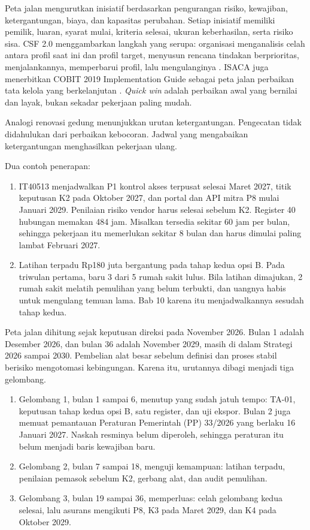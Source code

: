 Peta jalan mengurutkan inisiatif berdasarkan pengurangan risiko, kewajiban, ketergantungan, biaya,
dan kapasitas perubahan. Setiap inisiatif memiliki pemilik, luaran, syarat mulai, kriteria
selesai, ukuran keberhasilan, serta risiko sisa. CSF 2.0 menggambarkan langkah yang serupa:
organisasi menganalisis celah antara profil saat ini dan profil target, menyusun rencana tindakan
berprioritas, menjalankannya, memperbarui profil, lalu mengulanginya \cite{nistcsf2}. ISACA juga
menerbitkan COBIT 2019 Implementation Guide sebagai peta jalan perbaikan tata kelola yang
berkelanjutan \cite{c08-isaca-press}. \textit{Quick win} adalah perbaikan awal yang bernilai dan
layak, bukan sekadar pekerjaan paling mudah.

Analogi renovasi gedung menunjukkan urutan ketergantungan. Pengecatan tidak didahulukan dari
perbaikan kebocoran. Jadwal yang mengabaikan ketergantungan menghasilkan pekerjaan ulang.

Dua contoh penerapan:
\begin{enumerate}
  \item IT40513 menjadwalkan P1 kontrol akses terpusat selesai Maret 2027, titik keputusan K2 pada
  Oktober 2027, dan portal dan API mitra P8 mulai Januari 2029. Penilaian risiko vendor harus selesai
  sebelum K2. Register 40 hubungan memakan 484 jam. Misalkan tersedia sekitar 60 jam per bulan,
  sehingga pekerjaan itu memerlukan sekitar 8 bulan dan harus dimulai paling lambat Februari 2027.
  \item Latihan terpadu Rp180 juta bergantung pada tahap kedua opsi B. Pada triwulan pertama, baru
  3 dari 5 rumah sakit lulus. Bila latihan dimajukan, 2 rumah sakit melatih pemulihan yang belum
  terbukti, dan uangnya habis untuk mengulang temuan lama. Bab 10 karena itu menjadwalkannya
  sesudah tahap kedua.
\end{enumerate}

Peta jalan dihitung sejak keputusan direksi pada November 2026. Bulan 1 adalah Desember 2026, dan
bulan 36 adalah November 2029, masih di dalam Strategi 2026 sampai 2030. Pembelian alat besar
sebelum definisi dan proses stabil berisiko mengotomasi kebingungan. Karena itu, urutannya dibagi
menjadi tiga gelombang.
\begin{enumerate}
  \item Gelombang 1, bulan 1 sampai 6, menutup yang sudah jatuh tempo: TA-01, keputusan tahap
  kedua opsi B, satu register, dan uji ekspor. Bulan 2 juga memuat pemantauan Peraturan Pemerintah
  (PP) 33/2026 yang berlaku 16 Januari 2027. Naskah resminya belum diperoleh, sehingga peraturan
  itu belum menjadi baris kewajiban baru.
  \item Gelombang 2, bulan 7 sampai 18, menguji kemampuan: latihan terpadu, penilaian pemasok
  sebelum K2, gerbang alat, dan audit pemulihan.
  \item Gelombang 3, bulan 19 sampai 36, memperluas: celah gelombang kedua selesai, lalu asurans
  mengikuti P8, K3 pada Maret 2029, dan K4 pada Oktober 2029.
\end{enumerate}


